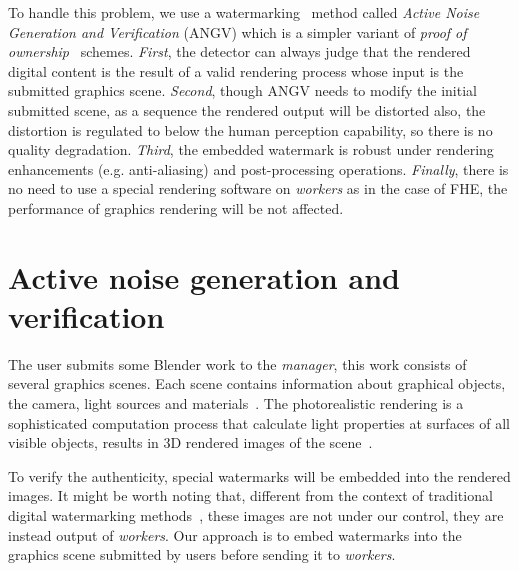 \documentclass[a4paper,11pt,onecolumn]{memoir}
\begin{document}
To handle this problem, we use a watermarking~\cite{Cox1997,Cox1999} method called \emph{Active Noise Generation and Verification} (ANGV) which is a simpler variant of \emph{proof of ownership}~\cite{Craver1997} schemes. \emph{First}, the detector can always judge that the rendered digital content is the result of a valid rendering process whose input is the submitted graphics scene. \emph{Second}, though ANGV needs to modify the initial submitted scene, as a sequence the rendered output will be distorted also, the distortion is regulated to below the human perception capability, so there is no quality degradation. \emph{Third}, the embedded watermark is robust under rendering enhancements (e.g. anti-aliasing) and post-processing operations. \emph{Finally}, there is no need to use a special rendering software on \emph{workers} as in the case of FHE, the performance of graphics rendering will be not affected.


\section[Active noise generation and verification]{Active noise generation and verification}
The user submits some Blender work to the \emph{manager}, this work consists of several graphics scenes. Each scene contains information about graphical objects, the camera, light sources and materials~\cite{Blender}. The photorealistic rendering is a sophisticated computation process that calculate light properties at surfaces of all visible objects, results in 3D rendered images of the scene~\cite{Hughes2014}.

To verify the authenticity, special watermarks will be embedded into the rendered images. It might be worth noting that, different from the context of traditional digital watermarking methods~\cite{Cox2008}, these images are not under our control, they are instead output of \emph{workers}. Our approach is to embed watermarks into the graphics scene submitted by users before sending it to \emph{workers}.
\end{document}
